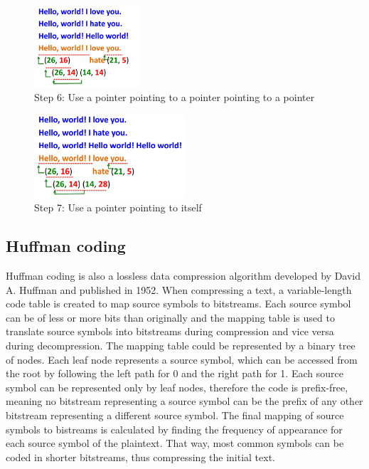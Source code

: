 \begin{figure}[H] \caption{Step 6: Use a pointer pointing to a pointer pointing
to a pointer} \centering
\includegraphics[width=0.35\textwidth]{diagrams/lz77_6.png}\end{figure}
\begin{figure}[H] \caption{Step 7: Use a pointer pointing to itself} \centering
\includegraphics[width=0.5\textwidth]{diagrams/lz77_7.png}\end{figure}


\subsection{Huffman coding}\label{subsec:huffman}

Huffman coding is also a lossless data compression algorithm developed by David
A. Huffman and published in 1952. \cite{huffman} When compressing a text, a
variable-length code table is created to map source symbols to bitstreams. Each
source symbol can be of less or more bits than originally and the mapping table
is used to translate source symbols into bitstreams during compression and vice
versa during decompression. The mapping table could be represented by a binary
tree of nodes. Each leaf node represents a source symbol, which can be accessed
from the root by following the left path for 0 and the right path for 1. Each
source symbol can be represented only by leaf nodes, therefore the code is
prefix-free, meaning no bitstream representing a source symbol can be the prefix
of any other bitstream representing a different source symbol. The final mapping
of source symbols to bistreams is calculated by finding the frequency of
appearance for each source symbol of the plaintext. That way, most common
symbols can be coded in shorter bitstreams, thus compressing the initial text.

